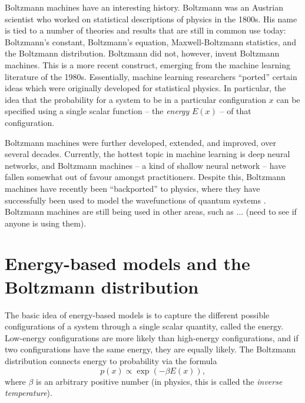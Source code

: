 \documentclass[a4paper]{article}
\begin{document}

Boltzmann machines have an interesting history. Boltzmann was an Austrian scientist who worked on statistical descriptions of physics in the 1800s. His name is tied to a number of theories and results that are still in common use today: Boltzmann's constant, Boltzmann's equation, Maxwell-Boltzmann statistics, and the Boltzmann distribution. Boltzmann did not, however, invent Boltzmann machines. This is a more recent construct, emerging from the machine learning literature of the 1980s. Essentially, machine learning researchers ``ported'' certain ideas which were originally developed for statistical physics. In particular, the idea that the probability for a system to be in a particular configuration $x$ can be specified using a single scalar function -- the \emph{energy} $E(x)$ -- of that configuration. 

Boltzmann machines were further developed, extended, and improved, over several decades. Currently, the hottest topic in machine learning is deep neural networks, and Boltzmann machines -- a kind of shallow neural network -- have fallen somewhat out of favour amongst practitioners. Despite this, Boltzmann machines have recently been ``backported'' to physics, where they have successfully been used to model the wavefunctions of quantum systems \cite{...}. Boltzmann machines are still being used in other areas, such as ... (need to see if anyone is using them). \textcolor{red}{}

\section{Energy-based models and the Boltzmann distribution}

The basic idea of energy-based models is to capture the different possible configurations of a system through a single scalar quantity, called the energy. Low-energy configurations are more likely than high-energy configurations, and if two configurations have the same energy, they are equally likely. The Boltzmann distribution connects energy to probability via the formula
\begin{equation}
 p(x) \propto \exp(-\beta E(x)),
\end{equation}
where $\beta$ is an arbitrary positive number (in physics, this is called the \emph{inverse temperature}). 
\end{document}
